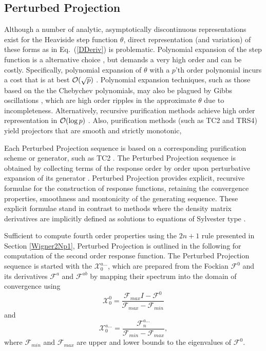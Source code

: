 \documentclass[prl,twocolumn,showpacs,twocolumngrid,superbib]{revtex4}
\def\F{\mathcal{F}}
\def\X{\mathcal{X}}
\begin{document}

\subsection{Perturbed Projection}\label{ResponseFunctions}

Although a number of analytic, asymptotically discontinuous representations exist for the Heaviside 
step function $\theta$, direct representation (and variation) of these forms as in Eq.~(\ref{DDeriv}) 
is problematic. Polynomial expansion of the step function is a alternative choice \cite{SGoedecker95b}, but 
demands a very high order and can be costly.  Specifically, polynomial expansion of $\theta$ with a $p$'th order polynomial 
incurs a cost that is at best ${\cal O}(\sqrt{p})$ \cite{WLiang03,WLiang04}.  Polynomial expansion techniques,
such as those based on the the Chebychev polynomials, may also be plagued by Gibbs oscillations \cite{AVoter96},
which are high order ripples in the approximate $\theta$ due to incompleteness.
Alternatively, recursive purification methods achieve high order representation in 
${\cal O}( \log p )$ \cite{ANiklasson03}.  Also, purification methods (such as TC2 and TRS4) 
yield projectors that are smooth and strictly monotonic,  

Each Perturbed Projection sequence is based on a corresponding  purification scheme or generator, such as TC2 \cite{ANiklasson02A}.   
The Perturbed Projection sequence is obtained by collecting terms of the response order by 
order upon perturbative expansion of its generator \cite{ANiklasson04}.
Perturbed Projection provides explicit, recursive formulae 
for the construction of response functions, retaining the convergence properties,  smoothness and 
montonicity of the generating sequence.   These explicit formulae stand in contrast to methods where the 
density matrix derivatives are implicitly defined as solutions to equations of Sylvester type \cite{Ochsenfeld97,HLarsen01a,COchsenfeld04}.

Sufficient to compute fourth order properties using the $2 n+1$ rule presented in Section \ref{Wigner2Np1}, 
Perturbed Projection is outlined in the following for computation of the second order response function.  
The Perturbed Projection sequence is started with the  $\X^{a\ldots}_{0}$, which are 
prepared from the Fockian $\F^0$ and its derivatives $\F^a$ and $\F^{ab}$ by  mapping their spectrum 
into the domain of convergence \cite{ANiklasson02A} using
\begin{equation}
    \X^0_{0}=\frac{\F_{max}I-\F^0}{\F_{max}-\F_{min}} 
\end{equation}
and 
\begin{equation}
    \X^{a\ldots}_{0}=\frac{\F^{a\ldots}_{n}}{\F_{min}-\F_{max}},
\end{equation}
where $\F_{min}$ and $\F_{max}$ are upper and lower bounds to the eigenvalues of $\F^0$.  
\end{document}
